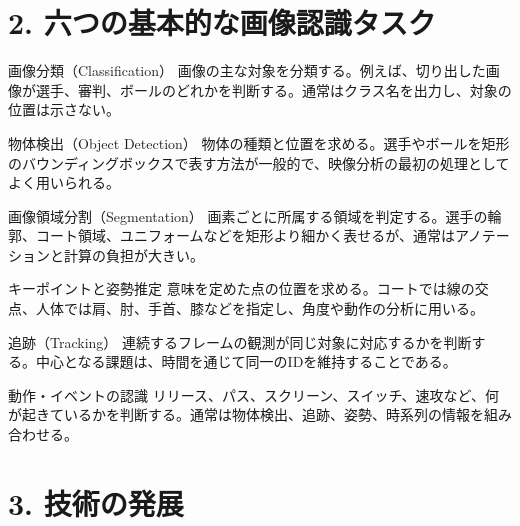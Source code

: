 \documentclass[11pt,a4paper,oneside]{report}
\begin{document}
\section*{2. 六つの基本的な画像認識タスク}

\begin{tcbraster}[raster columns=2,raster equal height=rows,raster column skip=7pt,raster row skip=7pt]
\begin{termBox}{画像分類（Classification）}
画像の主な対象を分類する。例えば、切り出した画像が選手、審判、ボールのどれかを判断する。通常はクラス名を出力し、対象の位置は示さない。
\end{termBox}
\begin{termBox}{物体検出（Object Detection）}
物体の種類と位置を求める。選手やボールを矩形のバウンディングボックスで表す方法が一般的で、映像分析の最初の処理としてよく用いられる。
\end{termBox}
\begin{termBox}{画像領域分割（Segmentation）}
画素ごとに所属する領域を判定する。選手の輪郭、コート領域、ユニフォームなどを矩形より細かく表せるが、通常はアノテーションと計算の負担が大きい。
\end{termBox}
\begin{termBox}{キーポイントと姿勢推定}
意味を定めた点の位置を求める。コートでは線の交点、人体では肩、肘、手首、膝などを指定し、角度や動作の分析に用いる。
\end{termBox}
\begin{termBox}{追跡（Tracking）}
連続するフレームの観測が同じ対象に対応するかを判断する。中心となる課題は、時間を通じて同一のIDを維持することである。
\end{termBox}
\begin{termBox}{動作・イベントの認識}
リリース、パス、スクリーン、スイッチ、速攻など、何が起きているかを判断する。通常は物体検出、追跡、姿勢、時系列の情報を組み合わせる。
\end{termBox}
\end{tcbraster}

\section*{3. 技術の発展}
\end{document}
